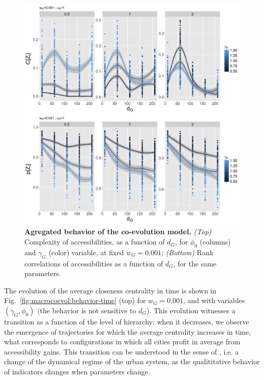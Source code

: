 \documentclass[11pt]{article}
\begin{document}
\begin{figure}
\includegraphics[width=\linewidth]{6-2-2-fig-macrocoevol-behavior-aggreg.jpg}
\caption{\textbf{Agregated behavior of the co-evolution model.} \textit{(Top)} Complexity of accessibilities, as a function of $d_G$, for $\phi_0$ (columns) and $\gamma_G$ (color) variable, at fixed $w_G = 0.001$; \textit{(Bottom)} Rank correlations of accessibilities as a function of $d_G$, for the same parameters.\label{fig:macrocoevol:behavior-aggreg}}
\end{figure}


The evolution of the average closeness centrality in time is shown in Fig.~\ref{fig:macrocoevol:behavior-time} (top) for $w_G = 0.001$, and with variables $(\gamma_G,\phi_0)$ (the behavior is not sensitive to $d_G$). This evolution witnesses a transition as a function of the level of hierarchy: when it decreases, we observe the emergence of trajectories for which the average centrality increases in time, what corresponds to configurations in which all cities profit in average from accessibility gains. This transition can be understood in the sense of \cite{sanders2017peupler}, i.e. a change of the dynamical regime of the urban system, as the qualititative behavior of indicators changes when parameters change.
\end{document}
